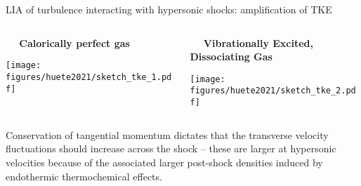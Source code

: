 \documentclass[9pt, aspectratio=1609]{beamer}
\begin{document}
\begin{frame}{\large LIA of turbulence interacting with hypersonic shocks: amplification of TKE}
\begin{columns}[c] 
    \begin{column}{.48\textwidth}%
    \vspace{-0.45cm}
    \begin{center}
        \vspace{-0.3cm}\textbf{$\quad$ Calorically perfect gas}\\ \vspace{0.3cm}
    \end{center}
     \texttt{[image: figures/huete2021/sketch\_tke\_1.pdf]}
    \end{column}%
    \begin{column}{.48\textwidth}
    \begin{center}
        \vspace{-0.3cm}\textbf{$\quad$ Vibrationally Excited, Dissociating Gas}\\ \vspace{0.3cm}
    \end{center}
    \texttt{[image: figures/huete2021/sketch\_tke\_2.pdf]}
    \end{column}%
\end{columns}
\vspace{0.3cm}
Conservation of tangential momentum dictates that the transverse velocity fluctuations should increase across the shock -- these are larger at hypersonic velocities because of the associated larger post-shock densities induced by endothermic thermochemical effects.
\end{frame}
\end{document}
